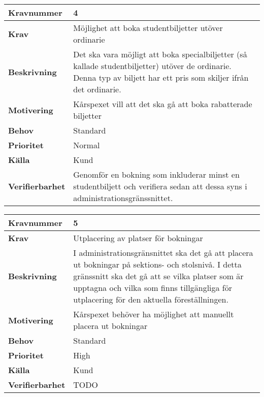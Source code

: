 \documentclass[a4paper, twoside, 11pt, titlepage]{article}
\begin{document}
\begin{tabular} { | p{3cm} | p{12.2cm} | }
	\hline
	\textbf{Kravnummer} & 4  \\
	\hline
	\textbf{Krav} & Möjlighet att boka studentbiljetter utöver ordinarie  \\
	\hline
	\textbf{Beskrivning} & Det ska vara möjligt att boka specialbiljetter (så kallade studentbiljetter) utöver de ordinarie. Denna typ av biljett har ett pris som skiljer ifrån det ordinarie.  \\
	\hline
	\textbf{Motivering} & Kårspexet vill att det ska gå att boka rabatterade biljetter  \\
	\hline
	\textbf{Behov} & Standard  \\
	\hline
	\textbf{Prioritet} & Normal  \\
	\hline
	\textbf{Källa} & Kund  \\
	\hline
	\textbf{Verifierbarhet} & Genomför en bokning som inkluderar minst en studentbiljett och verifiera sedan att dessa syns i administrationsgränssnittet.  \\
	\hline
\end{tabular}

\begin{tabular} { | p{3cm} | p{12.2cm} | }
	\hline
	\textbf{Kravnummer} & 5  \\
	\hline
	\textbf{Krav} & Utplacering av platser för bokningar  \\
	\hline
	\textbf{Beskrivning} & I administrationsgränsnittet ska det gå att placera ut bokningar på sektions- och stolsnivå. I detta gränssnitt ska det gå att se vilka platser som är upptagna och vilka som finns tillgängliga för utplacering för den aktuella föreställningen.  \\
	\hline
	\textbf{Motivering} & Kårspexet behöver ha möjlighet att manuellt placera ut bokningar  \\
	\hline
	\textbf{Behov} & Standard  \\
	\hline
	\textbf{Prioritet} & High  \\
	\hline
	\textbf{Källa} & Kund  \\
	\hline
	\textbf{Verifierbarhet} & TODO  \\
	\hline
\end{tabular}
\end{document}
